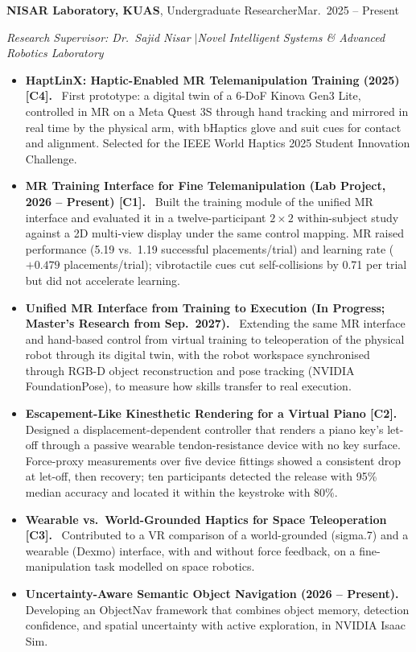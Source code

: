 \documentclass[11pt,a4paper]{article}
\newcommand{\entry}[3]{\par\Needspace{4\baselineskip}\textbf{#1}#2\hfill #3\par\nopagebreak}
\newcommand{\sub}[1]{{\itshape #1}\par}
\newcommand{\lab}[1]{\textbf{#1}\ }
\begin{document}
\entry{NISAR Laboratory, KUAS}{, Undergraduate Researcher}{Mar.\ 2025 -- Present}
\sub{Research Supervisor: Dr.\ Sajid Nisar \quad$|$\quad Novel Intelligent Systems \& Advanced Robotics Laboratory}
\begin{itemize}
  \item \lab{HaptLinX: Haptic-Enabled MR Telemanipulation Training (2025) [C4].} First prototype: a
        digital twin of a 6-DoF Kinova Gen3 Lite, controlled in MR on a Meta Quest 3S through hand
        tracking and mirrored in real time by the physical arm, with bHaptics glove and suit cues for
        contact and alignment. Selected for the IEEE World Haptics 2025 Student Innovation Challenge.
  \item \lab{MR Training Interface for Fine Telemanipulation (Lab Project, 2026 -- Present) [C1].}
        Built the training module of the unified MR interface and evaluated it in a twelve-participant
        $2\times2$ within-subject study against a 2D multi-view display under the same control mapping.
        MR raised performance (5.19 vs.\ 1.19 successful placements/trial) and learning rate
        ($+0.479$ placements/trial); vibrotactile cues cut self-collisions by 0.71 per trial but did not
        accelerate learning.
  \item \lab{Unified MR Interface from Training to Execution (In Progress; Master's Research from Sep.\ 2027).}
        Extending the same MR interface and hand-based control from virtual training to teleoperation of
        the physical robot through its digital twin, with the robot workspace synchronised through RGB-D
        object reconstruction and pose tracking (NVIDIA FoundationPose), to measure how skills transfer
        to real execution.
  \item \lab{Escapement-Like Kinesthetic Rendering for a Virtual Piano [C2].} Designed a
        displacement-dependent controller that renders a piano key's let-off through a passive wearable
        tendon-resistance device with no key surface. Force-proxy measurements over five device fittings
        showed a consistent drop at let-off, then recovery; ten participants detected the release with
        95\% median accuracy and located it within the keystroke with 80\%.
  \item \lab{Wearable vs.\ World-Grounded Haptics for Space Teleoperation [C3].} Contributed to a VR
        comparison of a world-grounded (sigma.7) and a wearable (Dexmo) interface, with and without force
        feedback, on a fine-manipulation task modelled on space robotics.
  \item \lab{Uncertainty-Aware Semantic Object Navigation (2026 -- Present).} Developing an ObjectNav
        framework that combines object memory, detection confidence, and spatial uncertainty with active
        exploration, in NVIDIA Isaac Sim.
\end{itemize}
\end{document}
